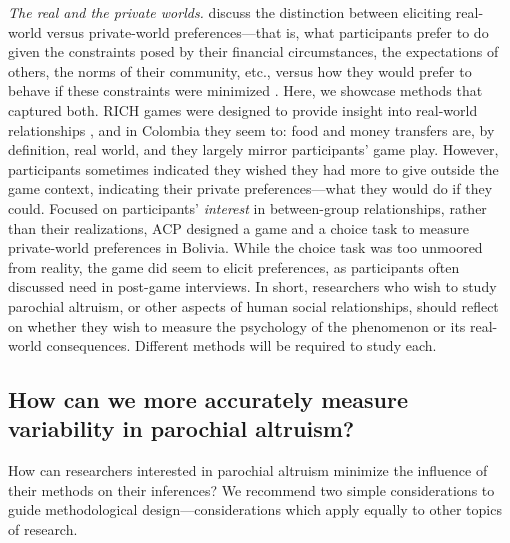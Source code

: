 \documentclass[bibauthoryear]{aa}
\begin{document}
\emph{The real and the private worlds.} \citet{Pisor2020} discuss the distinction between eliciting real-world versus private-world preferences---that is, what participants prefer to do given the constraints posed by their financial circumstances, the expectations of others, the norms of their community, etc., versus how they would prefer to behave if these constraints were minimized   \citep[see also][]{Naar2020}. Here, we showcase methods that captured both. RICH games were designed to provide insight into real-world relationships \citep{gervais2017rich, Pisor2020}, and in Colombia they seem to: food and money transfers are, by definition, real world, and they largely mirror participants' game play. However, participants sometimes indicated they wished they had more to give outside the game context, indicating their private preferences---what they would do if they could. Focused on participants' \emph{interest} in between-group relationships, rather than their realizations, ACP designed a game and a choice task to measure private-world preferences in Bolivia. While the choice task was too unmoored from reality, the game did seem to elicit preferences, as participants often discussed need in post-game interviews. In short, researchers who wish to study parochial altruism, or other aspects of human social relationships, should reflect on whether they wish to measure the psychology of the phenomenon or its real-world consequences. Different methods will be required to study each.

\subsection{How can we more accurately measure variability in parochial altruism?}

How can researchers interested in parochial altruism minimize the influence of their methods on their inferences? We recommend two simple considerations to guide methodological design---considerations which apply equally to other topics of research.
\end{document}
